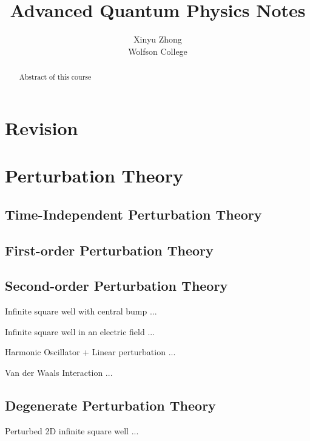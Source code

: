 \documentclass[12pt,a4paper]{article}
\author{Xinyu Zhong\\Wolfson College}
\title{Advanced Quantum Physics Notes}
\begin{document}
\begin{titlepage}
    \maketitle
\end{titlepage}

\tableofcontents

\newpage

\begin{abstract}
\noindent
Abstract of this course
\end{abstract}

\section{Revision}
\section{Perturbation Theory}
\subsection{Time-Independent Perturbation Theory}
\subsection{First-order Perturbation Theory}
\subsection{Second-order Perturbation Theory}
\begin{example}
    {Infinite square well with central bump}
    {...}
\end{example}
\begin{example}
    {Infinite square well in an electric field}
    {...}
\end{example}
\begin{example}
    {Harmonic Oscillator + Linear perturbation}
    {...}
\end{example}
\begin{example}
    {Van der Waals Interaction}
    {...}
\end{example}
\subsection{Degenerate Perturbation Theory}
\begin{example}
    {Perturbed 2D infinite square well}
    {...}
\end{example}
\end{document}

